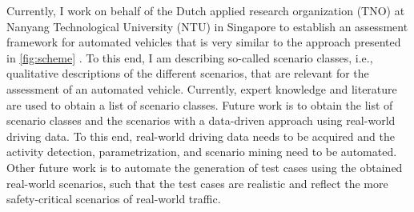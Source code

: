 \documentclass[10pt,final,a4paper,oneside,onecolumn]{article}
\begin{document}
Currently, I work on behalf of the Dutch applied research organization (TNO) at Nanyang Technological University (NTU) in Singapore to establish an assessment framework for automated vehicles that is very similar to the approach presented in \cref{fig:scheme} \cite{ploeg2018cetran}. To this end, I am describing so-called scenario classes, i.e., qualitative descriptions of the different scenarios, that are relevant for the assessment of an automated vehicle. Currently, expert knowledge and literature are used to obtain a list of scenario classes. Future work is to obtain the list of scenario classes and the scenarios with a data-driven approach using real-world driving data. To this end, real-world driving data needs to be acquired and the activity detection, parametrization, and scenario mining need to be automated. Other future work is to automate the generation of test cases using the obtained real-world scenarios, such that the test cases are realistic and reflect the more safety-critical scenarios of real-world traffic.
\end{document}
